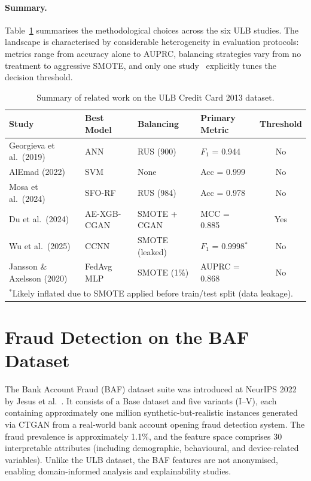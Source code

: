 \paragraph{Summary.}
Table~\ref{tab:rw_ulb_summary} summarises the methodological choices across the six ULB studies. The landscape is characterised by considerable heterogeneity in evaluation protocols: metrics range from accuracy alone to AUPRC, balancing strategies vary from no treatment to aggressive SMOTE, and only one study~\cite{du2024novel} explicitly tunes the decision threshold.

\begin{table}[ht]
\centering
\caption{Summary of related work on the ULB Credit Card 2013 dataset.}
\label{tab:rw_ulb_summary}
\small
\begin{tabular}{l l l l c}
\toprule
Study & Best Model & Balancing & Primary Metric & Threshold \\
\midrule
Georgieva et al.\ (2019) & ANN          & RUS (900)       & $F_1$ = 0.944         & No  \\
AlEmad (2022)             & SVM          & None            & Acc = 0.999           & No  \\
Mosa et al.\ (2024)      & SFO-RF       & RUS (984)       & Acc = 0.978           & No  \\
Du et al.\ (2024)        & AE-XGB-CGAN  & SMOTE + CGAN    & MCC = 0.885           & Yes \\
Wu et al.\ (2025)        & CCNN         & SMOTE (leaked)  & $F_1$ = 0.9998$^{*}$  & No  \\
Jansson \& Axelsson (2020)& FedAvg MLP  & SMOTE (1\%)     & AUPRC = 0.868         & No  \\
\bottomrule
\multicolumn{5}{l}{\footnotesize $^{*}$Likely inflated due to SMOTE applied before train/test split (data leakage).}
\end{tabular}
\end{table}


\section{Fraud Detection on the BAF Dataset}
\label{sec:rw_baf}

The Bank Account Fraud (BAF) dataset suite was introduced at NeurIPS 2022 by Jesus et al.~\cite{jesus2022turning}. It consists of a Base dataset and five variants (I--V), each containing approximately one million synthetic-but-realistic instances generated via CTGAN from a real-world bank account opening fraud detection system. The fraud prevalence is approximately 1.1\%, and the feature space comprises 30 interpretable attributes (including demographic, behavioural, and device-related variables). Unlike the ULB dataset, the BAF features are not anonymised, enabling domain-informed analysis and explainability studies.

